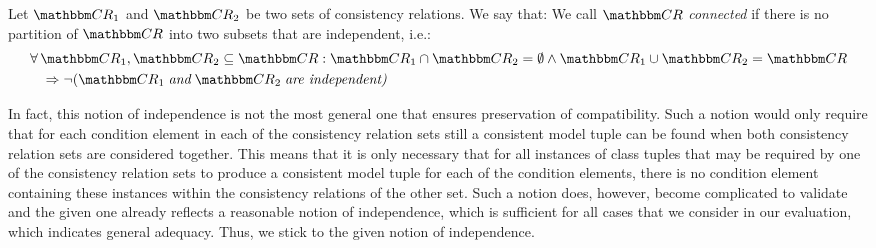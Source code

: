\begin{definition}
    \label{def:independence}
    Let $\consistencyrelationset{CR}_{1}$ and $\consistencyrelationset{CR}_{2}$ be two sets of consistency relations. We say that:
    We call $\consistencyrelationset{CR}$ \emph{connected} if there is no partition of $\consistencyrelationset{CR}$ into two subsets that are independent, i.e.:
    \begin{align*}
        &
        \forall \consistencyrelationset{CR}_{1}, \consistencyrelationset{CR}_{2} \subseteq \consistencyrelationset{CR} :
        \consistencyrelationset{CR}_{1} \cap \consistencyrelationset{CR}_{2} = \emptyset \land \consistencyrelationset{CR}_{1} \cup \consistencyrelationset{CR}_{2} = \consistencyrelationset{CR}  \\
        & \formulaskip
        \Rightarrow \neg (\consistencyrelationset{CR}_{1} \andmath \consistencyrelationset{CR}_{2} \mathtextspacearound{are independent)}
    \end{align*}
\end{definition}

In fact, this notion of independence is not the most general one that ensures preservation of compatibility.
Such a notion would only require that for each condition element in each of the consistency relation sets still a consistent model tuple can be found when both consistency relation sets are considered together.
This means that it is only necessary that for all instances of class tuples that may be required by one of the consistency relation sets to produce a consistent model tuple for each of the condition elements, there is no condition element containing these instances within the consistency relations of the other set.
Such a notion does, however, become complicated to validate and the given one already reflects a reasonable notion of independence, which is sufficient for all cases that we consider in our evaluation, which indicates general adequacy.
Thus, we stick to the given notion of independence.

